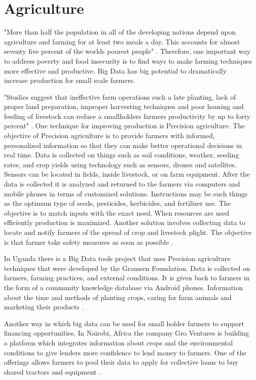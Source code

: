 \documentclass[sigconf]{acmart}
\begin{document}
\section{Agriculture}

"More than half the population in all of the developing nations depend upon agriculture and farming for at least two meals a day. This accounts for almost seventy five percent of the worlds poorest people" \cite{www-google-top10}.  Therefore, one important way to address poverty and food insecurity is to find ways to make farming techniques more effective and productive. Big Data has big potential to dramatically increase production for small scale farmers.

"Studies suggest that ineffective farm operations such a late planting, lack of proper land preparation, improper harvesting techniques and poor housing and feeding of livestock can reduce a smallholders farmers productivity by up to forty percent" \cite{DevEcon}.
One technique for improving production is Precision agriculture. The objective of Precision agriculture is to provide farmers with informed, personalized information so that they can make better operational decisions in real time. Data is collected on things such as soil conditions, weather, seeding rates, and crop yields using technology such as sensors, drones and satellites\cite{DevEcon}. Sensors can be located in fields, inside livestock, or on farm equipment.  After the data is collected it is analyzed and returned to the farmers via computers and mobile phones in terms of customized solutions. Instructions may be such things as the optimum type of seeds, pesticides, herbicides, and fertilizer use. The objective is to match inputs with the exact need. When resources are used efficiently production is maximized. Another solution involves collecting data to locate and notify farmers of the spread of crop and livestock plight. The objective is that farmer take safety measures as soon as possible \cite{www-google-Hffpst}.

In Uganda there is a Big Data tools project that uses Precision agriculture techniques that were developed by the Grameen Foundation. Data is collected on farmers, farming practices, and external conditions. It is given back to farmers in the form of a community knowledge database via Android phones. Information about the time and methods of planting crops, caring for farm animals and marketing their products \cite{DevEcon}.

Another way in which big data can be used for small holder farmers to support financing opportunities. In Nairobi, Africa the company Gro Ventures is building a platform which integrates information about crops and the environmental conditions to give lenders more confidence to lend money to farmers. One of the offerings allows farmers to pool their data to apply for collective loans to buy shared tractors and equipment \cite{www-google-Hffpst}.  
\end{document}
